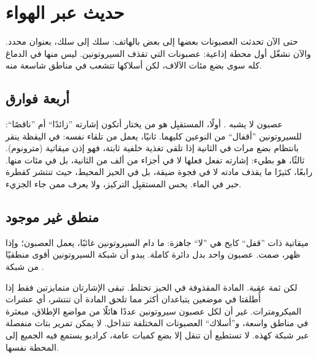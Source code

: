 \chapter{حديث عبر الهواء}


حتى الآن تحدثت العصبونات بعضها إلى بعض بالهاتف: سلك إلى سلك، بعنوان محدد. والآن نشغّل أول محطة إذاعية: عصبونات  التي تقذف السيروتونين. ليس منها في الدماغ كله سوى بضع مئات الآلاف، لكن أسلاكها تتشعب في مناطق شاسعة منه.

\section*{أربعة فوارق}

عصبون  لا يشبه . أولًا، المستقبِل هو من يختار أتكون إشارته ”زائدًا“ أم ”ناقصًا“: للسيروتونين ”أقفال“ من النوعين كليهما. ثانيًا، يعمل من تلقاء نفسه: في اليقظة ينقر بانتظام بضع مرات في الثانية إذا تلقى تغذية خلفية ثابتة، فهو إذن ميقاتية (مترونوم). ثالثًا، هو بطيء: إشارته تفعل فعلها لا في أجزاء من ألف من الثانية، بل في مئات منها. رابعًا، كثيرًا ما يقذف مادته لا في فجوة ضيقة، بل في الحيز المحيط، حيث تنتشر كقطرة حبر في الماء. يحس المستقبِل التركيز، ولا يعرف ممن جاء الجزيء.

\section*{منطق غير موجود}

ميقاتية ذات ”قفل“ كابح هي ”لا“ جاهزة: ما دام السيروتونين غائبًا، يعمل العصبون؛ وإذا ظهر، صمت. عصبون واحد بدل دائرة كاملة. يبدو أن شبكة السيروتونين أقوى منطقيًا من شبكة .

لكن ثمة عقبة. المادة المقذوفة في الحيز تختلط. تبقى الإشارتان متمايزتين فقط إذا أُطلقتا في موضعين يتباعدان أكثر مما تلحق المادة أن تنتشر، أي عشرات الميكرومترات. غير أن لكل عصبون سيروتونين عددًا هائلًا من مواضع الإطلاق، مبعثرة في مناطق واسعة، و”أسلاك“ العصبونات المختلفة تتداخل. لا يمكن تمرير بتات منفصلة عبر شبكة كهذه. لا تستطيع أن تنقل إلا بضع كميات عامة، كراديو يستمع فيه الجميع إلى المحطة نفسها.


